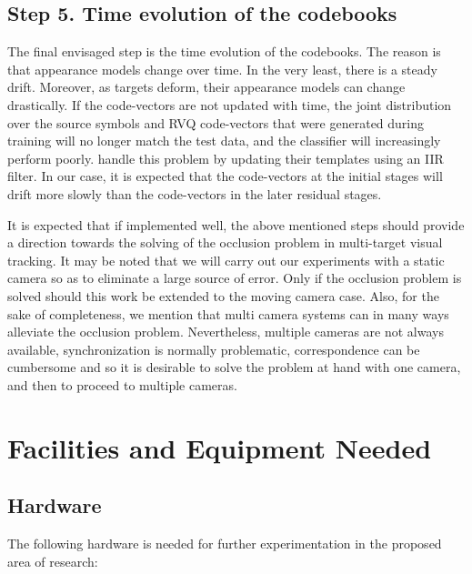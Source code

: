 \documentclass[12pt,letterpaper,doublespaced,ETD,proposal]{gt-ece-thesis}
\begin{document}
\begin{Body}
\subsection{Step 5. Time evolution of the codebooks} 
The final envisaged step is the time evolution of the codebooks.  The reason is that appearance models change over time.  In the very least, there is a steady drift.  Moreover, as targets deform, their appearance models can change drastically.  If the code-vectors are not updated with time, the joint distribution over the source symbols and RVQ code-vectors that were generated during training will no longer match the test data, and the classifier will increasingly perform poorly.  \cite{1998_CNF_Tracking_Lipton} handle this problem by updating their templates using an IIR filter.  In our case, it is expected that the code-vectors at the initial stages will drift more slowly than the code-vectors in the later residual stages.

It is expected that if implemented well, the above mentioned steps should provide a direction towards the solving of the occlusion problem in multi-target visual tracking.  It may be noted that we will carry out our experiments with a static camera so as to eliminate a large source of error.  Only if the occlusion problem is solved should this work be extended to the moving camera case.  Also, for the sake of completeness, we mention that multi camera systems can in many ways alleviate the occlusion problem.  Nevertheless, multiple cameras are not always available, synchronization is normally problematic, correspondence can be cumbersome and so it is desirable to solve the problem at hand with one camera, and then to proceed to multiple cameras.


\newpage
\section{Facilities and Equipment Needed}
\label{facilities}

\subsection{Hardware}

The following hardware is needed for further experimentation in the proposed area of research:


\end{Body}
\end{document}

